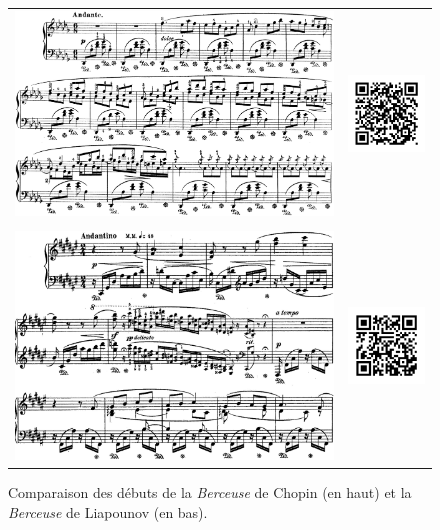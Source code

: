 \begin{figure}[!p]
  \begin{bigcenter}
    \begin{tabular}{lr}
      \vspace*{0.0cm}
      \includegraphics[width=12.5cm, keepaspectratio]{berceuse.png}
      &
      \includegraphics[width=3cm, keepaspectratio]{berceuse-qr.png}
      \\
      \vspace{0.5cm} &
      \\
      \includegraphics[width=12.5cm, keepaspectratio]{op11-i.png}
      &
      \includegraphics[width=3cm, keepaspectratio]{op11-qr.png}
    \end{tabular}
  \end{bigcenter}
  \caption{\label{op11-i}Comparaison des débuts de la \emph{Berceuse} de Chopin (en haut) et la \emph{Berceuse} de Liapounov (en bas).}
\end{figure}

